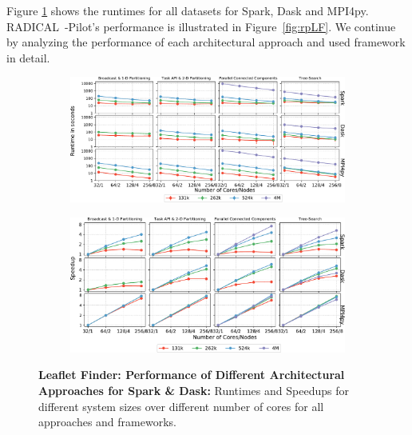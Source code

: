 Figure \ref{fig:All4approachesNoRp} shows the runtimes for all datasets for Spark, Dask and MPI4py.
RADICAL~-Pilot's performance is illustrated in Figure~\ref{fig:rpLF}.
We continue by analyzing the performance of each architectural approach and used framework in detail.

\begin{figure}[ht]
    \begin{subfigure}{.48\textwidth}
        \centering
        \includegraphics[width=1\linewidth]{figures/data_analytics_hpc/task_par/All4approachesWith4M_logscaleline.pdf}
    \end{subfigure}%
    \begin{subfigure}{.48\textwidth}
        \centering
        \includegraphics[width=.95\linewidth]{figures/data_analytics_hpc/task_par/All4approachesWith4MSpeedup.pdf}
    \end{subfigure}
    \caption{\textbf{Leaflet Finder: Performance of Different Architectural Approaches for Spark \& Dask:}
            Runtimes and Speedups for different system sizes over different number of cores for all approaches and frameworks.}
    \label{fig:All4approachesNoRp}
\end{figure}


